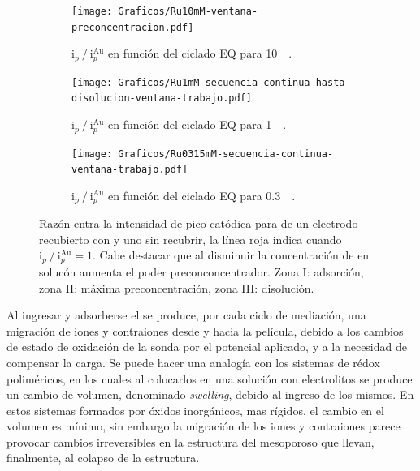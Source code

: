 		 	\begin{figure}[th]
	 	   	    \begin{subfigure}[t]{0.495\textwidth}
		        	\texttt{[image: Graficos/Ru10mM-ventana-preconcentracion.pdf]}
		       		\caption{$\text{i}_p\mathbin{/}\text{i}_p^{\text{Au}}$ en función del ciclado EQ para \ru\space \SI{10}{\milli\Molar}.}
		         	\label{fig:Ventana_Ru10mM}
		     		\end{subfigure}
	     		\begin{subfigure}[t]{0.495\textwidth}
		        	\texttt{[image: Graficos/Ru1mM-secuencia-continua-hasta-disolucion-ventana-trabajo.pdf]}
		       		\caption{$\text{i}_p\mathbin{/}\text{i}_p^{\text{Au}}$ en función del ciclado EQ para \ru\space \SI{1}{\milli\Molar}.}
		         	\label{fig:Ventana_Ru1mM}
		     		\end{subfigure}
	     		\begin{center}
	     		\begin{subfigure}[t]{0.495\textwidth}
		        	\texttt{[image: Graficos/Ru0315mM-secuencia-continua-ventana-trabajo.pdf]}
		       		\caption{$\text{i}_p\mathbin{/}\text{i}_p^{\text{Au}}$ en función del ciclado EQ para \ru\space \SI{0.3}{\milli\Molar}.}
		         	\label{fig:Ventana_Ru0315mM}
		     		\end{subfigure}
		     		\end{center}
	 	   	   	\caption[Intensidad en función del ciclado EQ para \pdmF]{Razón entra la intensidad de pico catódica para \ru\space de un electrodo recubierto con \pdm\space y uno sin recubrir, la línea roja indica cuando $\text{i}_p\mathbin{/}\text{i}_p^{\text{Au}} = 1$. Cabe destacar que al disminuir la concentración de \ru\space en solucón aumenta el poder preconconcentrador. Zona I: adsorción, zona II: máxima preconcentración, zona III: disolución.}
	     		\label{fig:ventanas}
	     	  \end{figure}

	    \pagebreak

		Al ingresar y adsorberse el \ru\space se produce, por cada ciclo de mediación, una migración de iones y contraiones desde y hacia la película, debido a los cambios de estado de oxidación de la sonda por el potencial aplicado, y a la necesidad de compensar la carga.  Se puede hacer una analogía con los sistemas de rédox poliméricos, en los cuales al colocarlos en una solución con electrolitos se produce un cambio de volumen, denominado \textit{swelling}, debido al ingreso de los mismos\cite{Ybarra2005}. En estos sistemas formados por óxidos inorgánicos, mas rígidos, el cambio en el volumen es mínimo,\cite{Malfatti2009} sin embargo la migración de los iones y contraiones parece provocar cambios irreversibles en la estructura del mesoporoso que llevan, finalmente, al colapso de la estructura.


